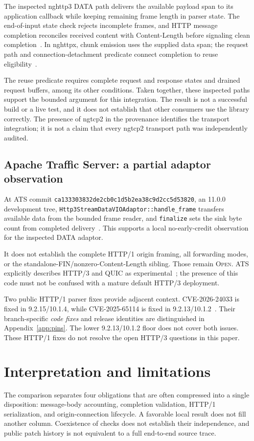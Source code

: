 \documentclass[11pt,letterpaper]{article}
\newcommand{\code}[1]{\nolinkurl{#1}}
\newcommand{\state}[1]{\textsc{#1}}
\begin{document}
The inspected nghttp3 DATA path delivers the available payload span to its application callback while keeping remaining frame length in parser state. The end-of-input state check rejects incomplete frames, and HTTP message completion reconciles received content with Content-Length before signaling clean completion~\cite{nghttp3conn,nghttp3http,nghttp3stream}. In nghttpx, chunk emission uses the supplied data span; the request path and connection-detachment predicate connect completion to reuse eligibility~\cite{nghttpxwriter,nghttpxreuse,nghttpxupstream}.

The reuse predicate requires complete request and response states and drained request buffers, among its other conditions. Taken together, these inspected paths support the bounded argument for this integration. The result is not a successful build or a live test, and it does not establish that other consumers use the library correctly. The presence of ngtcp2 in the provenance identifies the transport integration; it is not a claim that every ngtcp2 transport path was independently audited.

\subsection{Apache Traffic Server: a partial adaptor observation}
At ATS commit \code{ca133303832de2cb0c1d5b2ea38c9d2cc5d53820}, an 11.0.0 development tree, \code{Http3StreamDataVIOAdaptor::handle_frame} transfers available data from the bounded frame reader, and \code{finalize} sets the sink byte count from completed delivery~\cite{atsh3,atsframe}. This supports a local no-early-credit observation for the inspected DATA adaptor.

It does not establish the complete HTTP/1 origin framing, all forwarding modes, or the standalone-FIN/nonzero-Content-Length sibling. Those remain \state{Open}. ATS explicitly describes HTTP/3 and QUIC as experimental~\cite{atspolicy}; the presence of this code must not be confused with a mature default HTTP/3 deployment.

Two public HTTP/1 parser fixes provide adjacent context. CVE-2026-24033 is fixed in 9.2.15/10.1.4, while CVE-2025-65114 is fixed in 9.2.13/10.1.2~\cite{ats24033,ats65114}. Their branch-specific \emph{code fixes} and release identities are distinguished in Appendix~\ref{app:pins}. The lower 9.2.13/10.1.2 floor does not cover both issues. These HTTP/1 fixes do not resolve the open HTTP/3 questions in this paper.


\section{Interpretation and limitations}
The comparison separates four obligations that are often compressed into a single disposition: message-body accounting, completion validation, HTTP/1 serialization, and origin-connection lifecycle. A favorable local result does not fill another column. Coexistence of checks does not establish their independence, and public patch history is not equivalent to a full end-to-end source trace.
\end{document}
